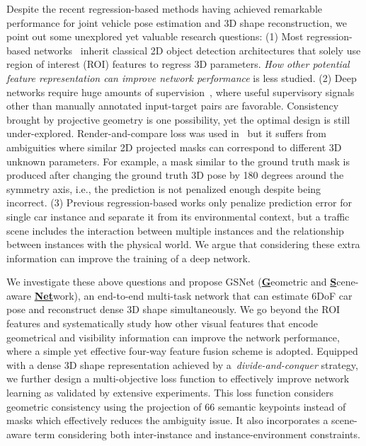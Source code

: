\documentclass[runningheads]{llncs}
\begin{document}
Despite the recent regression-based methods having achieved remarkable performance for joint vehicle pose estimation and 3D shape reconstruction, we point out some unexplored yet valuable research questions: 
(1) Most regression-based networks~\cite{kundu20183d,song2019apollocar3d,li2017deep} inherit classical 2D object detection architectures that solely use region of interest (ROI) features to regress 3D parameters. \textit{How other potential feature representation can improve network performance} is less studied. 
(2) Deep networks require huge amounts of supervision~\cite{kolotouros2019learning}, where useful supervisory signals other than manually annotated input-target pairs are favorable. Consistency brought by projective geometry is one possibility, yet the optimal design is still under-explored. Render-and-compare loss was used in~\cite{kundu20183d} but it suffers from ambiguities where similar 2D projected masks can correspond to different 3D unknown parameters. For example, a mask similar to the ground truth mask is produced after changing the ground truth 3D pose by 180 degrees around the symmetry axis, i.e., the prediction is not penalized enough despite being incorrect.
(3) Previous regression-based works only penalize prediction error for single car instance and separate it from its environmental context, but a traffic scene includes the interaction between multiple instances and the relationship between instances with the physical world. We argue that considering these extra information can improve the training of a deep network.

We investigate these above questions and propose GSNet (\textbf{\underline{G}}eometric and \textbf{\underline{S}}cene-aware \underline{\textbf{Net}}work), an end-to-end multi-task network that can estimate 6DoF car pose and reconstruct dense 3D shape simultaneously. We go beyond the ROI features and systematically study how other visual features that encode geometrical and visibility information can improve the network performance, where a simple yet effective four-way feature fusion scheme is adopted. Equipped with a dense 3D shape representation achieved by a~\textit{divide-and-conquer} strategy, we further design a multi-objective loss function to effectively improve network learning as validated by extensive experiments. This loss function considers geometric consistency using the projection of 66 semantic keypoints instead of masks which effectively reduces the ambiguity issue. It also incorporates a scene-aware term considering both inter-instance and instance-environment constraints.
\end{document}
